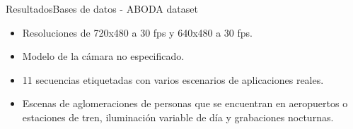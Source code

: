 
\begin{frame}{Resultados}{Bases de datos - ABODA dataset}

\begin{itemize}
    \justifying
    \item Resoluciones de 720x480 a 30 fps y 640x480 a 30 fps.
    \item Modelo de la cámara no especificado.
    \item 11 secuencias etiquetadas con varios escenarios de aplicaciones reales.
    \item Escenas de aglomeraciones de personas que se encuentran en aeropuertos o estaciones de tren, iluminación variable de día y grabaciones nocturnas.
\end{itemize}

\vspace{0.1cm}


\end{frame}
